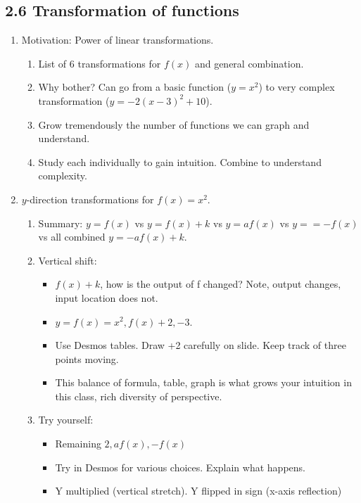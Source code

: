 \documentclass{article}
\begin{document}
\subsection{2.6 Transformation of functions}

\begin{enumerate}

\item Motivation: Power of linear transformations.
\begin{enumerate}
\item List of 6 transformations for $f(x)$ and general combination.
\item Why bother? Can go from a basic function ($y=x^2$) to very complex transformation ($y=-2(x-3)^2+10$).
\item Grow tremendously the number of functions we can graph and understand.
\item Study each individually to gain intuition. Combine to understand complexity.
\end{enumerate}

\item $y$-direction transformations for $f(x)=x^2$.
\begin{enumerate}
\item Summary: $y=f(x)$ vs $y=f(x)+k$ vs $y = af(x)$ vs $y= = -f(x)$ vs all combined $y=-af(x)+k$.
\item Vertical shift: 
\begin{itemize}
\item $f(x)+k$, how is the output of f changed? Note, output changes, input location does not.
\item $y=f(x)=x^2, f(x)+2, -3$.
\item Use Desmos tables. Draw +2 carefully on slide. Keep track of three points moving.
\item This balance of formula, table, graph is what grows your intuition in this class, rich diversity of perspective.
\end{itemize}
\item Try yourself: 
\begin{itemize}
\item Remaining $2, af(x), -f(x)$
\item Try in Desmos for various choices. Explain what happens. 
\item Y multiplied (vertical stretch). Y flipped in sign (x-axis reflection)
\end{itemize}
\end{enumerate}


\end{enumerate}
\end{document}
